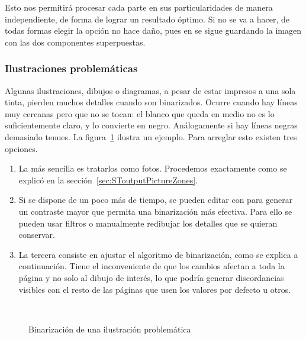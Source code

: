 \documentclass[%
	a5paper,
	10pt,
	twoside,
	openright,
	final,
]{memoir}
\begin{document}
{	Esto nos permitirá procesar cada parte en sus particularidades de manera independiente, de forma de lograr un resultado óptimo. Si no se va a hacer, de todas formas elegir la opción no hace daño, pues en  se sigue guardando la imagen con las dos componentes superpuestas.

	\subsubsection{Ilustraciones problemáticas} Algunas ilustraciones, dibujos o diagramas, a pesar de estar impresos a una sola tinta, pierden muchos detalles cuando son binarizados. Ocurre cuando hay líneas muy cercanas pero que no se tocan: el blanco que queda en medio no es lo suficientemente claro, y \scantailor lo convierte en negro. Análogamente si hay líneas negras demasiado tenues. La figura~\ref{fig:SToutputBadDiagrams} ilustra un ejemplo. Para arreglar esto existen tres opciones.

	\begin{enumerate}[noitemsep]
		\item La más sencilla es tratarlos como fotos. Procedemos exactamente como se explicó en la sección~\ref{sec:SToutputPictureZones}.
		\item Si se dispone de un poco más de tiempo, se pueden editar con \gimp para generar un contraste mayor que permita una binarización más efectiva. Para ello se pueden usar filtros o manualmente redibujar los detalles que se quieran conservar.
		\item La tercera consiste en ajustar el algoritmo de binarización, como se explica a continuación. Tiene el inconveniente de que los cambios afectan a toda la página y no solo al dibujo de interés, lo que podría generar discordancias visibles con el resto de las páginas que usen los valores por defecto u otros.
	\end{enumerate}

	\begin{figure}
		\hspace*{\fill}
		\hfill
		\hspace*{\fill}\\
		\hspace*{\fill}
		\hfill
		\hspace*{\fill}
		\caption{Binarización de una ilustración problemática\label{fig:SToutputBadDiagrams}}
	\end{figure}

}
\end{document}
